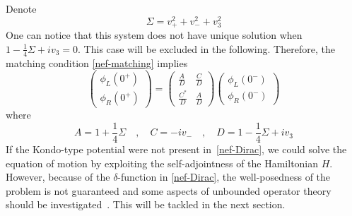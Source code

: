 Denote 
\begin{equation*}
\Sigma = v_+ ^ 2 + v_- ^ 2 + v_3 ^ 2
\end{equation*}
One can notice that this system does not have unique solution when $1 - \frac{1}{4}\Sigma + iv_3 = 0$. This case will be excluded in the following.
Therefore, the matching condition \cref{nef-matching} implies 
\begin{equation}\label{nef-matching2}
\begin{pmatrix}
\phi_L(0^+) \\
\phi_R(0^+)
\end{pmatrix} = \begin{pmatrix}
\frac{A}{D}  & \frac{C}{D} \\
\frac{C^*}{D} & \frac{A}{D}
\end{pmatrix}\begin{pmatrix}
\phi_L(0^-) \\
\phi_R(0^-)
\end{pmatrix}
\end{equation}
where 
\begin{equation*}
A = 1+ \frac{1}{4}\Sigma \quad, \quad
C = -iv_-  \quad, \quad
D = 1-\frac{1}{4}\Sigma + iv_3
\end{equation*}
%
If the Kondo-type potential were not present in~\cref{nef-Dirac}, 
we could solve the equation of motion by exploiting the self-adjointness of the Hamiltonian $H$.
However, because of the $\delta$-function in \cref{nef-Dirac}, 
the well-posedness of the problem is not guaranteed and some aspects of unbounded operator theory should be investigated~\cite{Reed1981}.
This will be tackled in the next section.
%



%
%
%
%


















